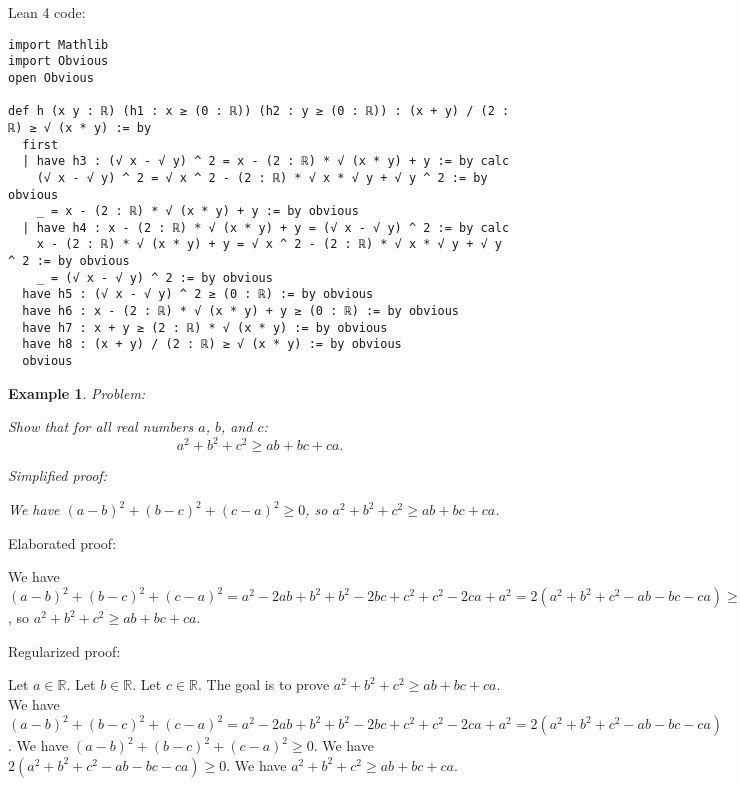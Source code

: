 \documentclass{article}
\newtheorem{example}{Example}
\begin{document}
Lean 4 code:
\begin{tcolorbox}[colback=white!10, width=\linewidth]
\begin{lstlisting}[language=Lean4]
import Mathlib
import Obvious
open Obvious

def h (x y : ℝ) (h1 : x ≥ (0 : ℝ)) (h2 : y ≥ (0 : ℝ)) : (x + y) / (2 : ℝ) ≥ √ (x * y) := by
  first
  | have h3 : (√ x - √ y) ^ 2 = x - (2 : ℝ) * √ (x * y) + y := by calc
    (√ x - √ y) ^ 2 = √ x ^ 2 - (2 : ℝ) * √ x * √ y + √ y ^ 2 := by obvious
    _ = x - (2 : ℝ) * √ (x * y) + y := by obvious
  | have h4 : x - (2 : ℝ) * √ (x * y) + y = (√ x - √ y) ^ 2 := by calc
    x - (2 : ℝ) * √ (x * y) + y = √ x ^ 2 - (2 : ℝ) * √ x * √ y + √ y ^ 2 := by obvious
    _ = (√ x - √ y) ^ 2 := by obvious
  have h5 : (√ x - √ y) ^ 2 ≥ (0 : ℝ) := by obvious
  have h6 : x - (2 : ℝ) * √ (x * y) + y ≥ (0 : ℝ) := by obvious
  have h7 : x + y ≥ (2 : ℝ) * √ (x * y) := by obvious
  have h8 : (x + y) / (2 : ℝ) ≥ √ (x * y) := by obvious
  obvious

\end{lstlisting}
\end{tcolorbox}


\begin{example}
Problem:
\begin{tcolorbox}[colback=yellow!10, width=\linewidth]
Show that for all real numbers $a$, $b$, and $c$:
    $$a^2 + b^2 + c^2 \geq ab + bc + ca.$$
\end{tcolorbox}

Simplified proof:
\begin{tcolorbox}[colback=blue!10, width=\linewidth]
We have $(a-b)^2+(b-c)^2+(c-a)^2 \ge 0$, so $a^2+b^2+c^2 \ge ab+bc+ca$.
\end{tcolorbox}
\end{example}

Elaborated proof:
\begin{tcolorbox}[colback=green!10, width=\linewidth]
We have $(a-b)^2+(b-c)^2+(c-a)^2 = a^2 - 2ab + b^2 + b^2 - 2bc + c^2 + c^2 - 2ca + a^2 = 2(a^2+b^2+c^2 - ab - bc - ca) \ge 0$, so $a^2+b^2+c^2 \ge ab+bc+ca$.
\end{tcolorbox}

Regularized proof:
\begin{tcolorbox}[colback=red!10, width=\linewidth]
Let $a\in\mathbb{R}$. Let $b\in\mathbb{R}$. Let $c\in\mathbb{R}$.
The goal is to prove $a^2+b^2+c^2 \ge ab+bc+ca$.
We have ${{(a-b)}}^2+{{(b-c)}}^2+{{(c-a)}}^2 = a^2 - 2ab + b^2 + b^2 - 2bc + c^2 + c^2 - 2ca + a^2 = 2(a^2+b^2+c^2 - ab - bc - ca)$.
We have ${{(a-b)}}^2+{{(b-c)}}^2+{{(c-a)}}^2 \ge 0$.
We have $2(a^2+b^2+c^2 - ab - bc - ca) \ge 0$.
We have $a^2+b^2+c^2 \ge ab+bc+ca$.
\end{tcolorbox}
\end{document}
